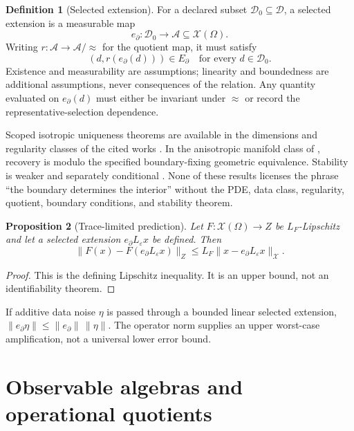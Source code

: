 \documentclass[11pt,a4paper]{article}
\theoremstyle{definition}
\newtheorem{definition}{Definition}[section]
\theoremstyle{plain}
\newtheorem{proposition}[definition]{Proposition}
\theoremstyle{remark}
\begin{document}
\begin{definition}[Selected extension]\label{def:selectedextension}
For a declared subset \(\mathcal D_0\subseteq\mathcal D\), a selected
extension is a measurable map
\[
e_\partial:\mathcal D_0\to\mathcal A\subseteq\mathcal X(\Omega).
\]
Writing \(r:\mathcal A\to\mathcal A/{\approx}\) for the quotient map, it
must satisfy
\[
(d,r(e_\partial(d)))\in E_\partial
\quad\text{for every }d\in\mathcal D_0.
\]
Existence and measurability are assumptions; linearity and
boundedness are additional assumptions, never consequences of the
relation.  Any quantity evaluated on \(e_\partial(d)\) must either be
invariant under \(\approx\) or record the representative-selection
dependence.
\end{definition}

Scoped isotropic uniqueness theorems are available in the dimensions and
regularity classes of the cited works
\citep{sylvesteruhlmann1987,astalapaivarinta2006}.  In the anisotropic
manifold class of \citet{lassasuhlmann2001}, recovery is modulo the specified
boundary-fixing geometric equivalence.  Stability is weaker and separately conditional
\citep{alessandrini1988}.  None of these results licenses the phrase
``the boundary determines the interior'' without the PDE, data class,
regularity, quotient, boundary conditions, and stability theorem.

\begin{proposition}[Trace-limited prediction]\label{prop:tracelimited}
Let \(F:\mathcal X(\Omega)\to Z\) be \(L_F\)-Lipschitz and let a selected
extension \(e_\partial L_\varepsilon x\) be defined.  Then
\[
\|F(x)-F(e_\partial L_\varepsilon x)\|_Z
\le L_F\|x-e_\partial L_\varepsilon x\|_{\mathcal X}.
\]
\end{proposition}
\begin{proof}
This is the defining Lipschitz inequality.  It is an upper bound, not an
identifiability theorem.
\end{proof}

If additive data noise \(\eta\) is passed through a bounded linear selected
extension,
\(\|e_\partial\eta\|\le\|e_\partial\|\,\|\eta\|\).  The operator norm supplies
an upper worst-case amplification, not a universal lower error bound.

\section{Observable algebras and operational quotients}\label{sec:quotients}
\end{document}
